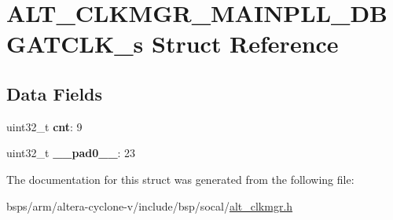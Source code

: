 \hypertarget{structALT__CLKMGR__MAINPLL__DBGATCLK__s}{}\section{A\+L\+T\+\_\+\+C\+L\+K\+M\+G\+R\+\_\+\+M\+A\+I\+N\+P\+L\+L\+\_\+\+D\+B\+G\+A\+T\+C\+L\+K\+\_\+s Struct Reference}
\label{structALT__CLKMGR__MAINPLL__DBGATCLK__s}
\subsection*{Data Fields}
\begin{DoxyCompactItemize}
\item 
\mbox{\label{structALT__CLKMGR__MAINPLL__DBGATCLK__s_a8e4de0d3b02c7de74fe5c520c07704da}} 
uint32\+\_\+t {\bfseries cnt}\+: 9
\item 
\mbox{\label{structALT__CLKMGR__MAINPLL__DBGATCLK__s_af756acfc2ea955d785617d436077f0d4}} 
uint32\+\_\+t {\bfseries \+\_\+\+\_\+pad0\+\_\+\+\_\+}\+: 23
\end{DoxyCompactItemize}


The documentation for this struct was generated from the following file\+:\begin{DoxyCompactItemize}
\item 
bsps/arm/altera-\/cyclone-\/v/include/bsp/socal/\mbox{\hyperlink{alt__clkmgr_8h}{alt\+\_\+clkmgr.\+h}}\end{DoxyCompactItemize}
